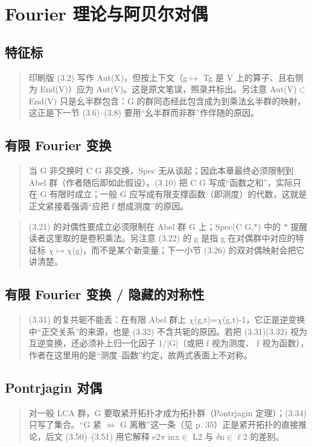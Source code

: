 \section{Fourier 理论与阿贝尔对偶}
\subsection*{特征标}
\begin{quote}\small
印刷版 (3.2) 写作 Aut(X)，但按上下文（g$\mapsto$ Tg 是 V 上的算子、且右侧为 End(V)）应为 Aut(V)。这是原文笔误，照录并标出。另注意 Aut(V)$\subset$End(V) 只是幺半群包含：G 的群同态经此包含成为到乘法幺半群的映射，这正是下一节 (3.6)--(3.8) 要用“幺半群而非群”作伴随的原因。
\end{quote}

\subsection*{有限 Fourier 变换}
\begin{quote}\small
当 G 非交换时 C G 非交换，Spec 无从谈起；因此本章最终必须限制到 Abel 群（作者随后即如此假设）。(3.10) 把 C G 写成“函数之和”，实际只在 G 有限时成立；一般 G 应写成有限支撑函数（即测度）的代数，这就是正文紧接着强调“应把 f 想成测度”的原因。
\end{quote}

\begin{quote}\small
(3.21) 的对偶性要成立必须限制在 Abel 群 G 上；Spec(C G,$\ast$) 中的 $\ast$ 提醒读者这里取的是卷积乘法。另注意 (3.22) 的 g 是指 g 在对偶群中对应的特征标 $\chi$$\mapsto$$\chi$(g)，而不是某个新变量；下一小节 (3.26) 的双对偶映射会把它讲清楚。
\end{quote}

\subsection*{有限 Fourier 变换 / 隐藏的对称性}
\begin{quote}\small
(3.31) 的复共轭不能丢：在有限 Abel 群上 $\chi$(g,t)=$\chi$(g,t)-1，它正是逆变换中“正交关系”的来源，也是 (3.32) 不含共轭的原因。若把 (3.31)(3.32) 视为互逆变换，还必须补上归一化因子 1/|G|（或把 f 视为测度、 f 视为函数），作者在这里用的是“测度--函数”约定，故两式表面上不对称。
\end{quote}

\subsection*{Pontrjagin 对偶}
\begin{quote}\small
对一般 LCA 群，G 要取紧开拓扑才成为拓扑群（Pontrjagin 定理）；(3.34) 只写了集合。“G 紧 $\Leftrightarrow$ G 离散”这一条（见 p. 35）正是紧开拓扑的直接推论，后文 (3.50)--(3.51) 用它解释 e2$\pi$ inx$\in$ L2 与 $\delta$n$\in$$\ell$2 的差别。
\end{quote}

